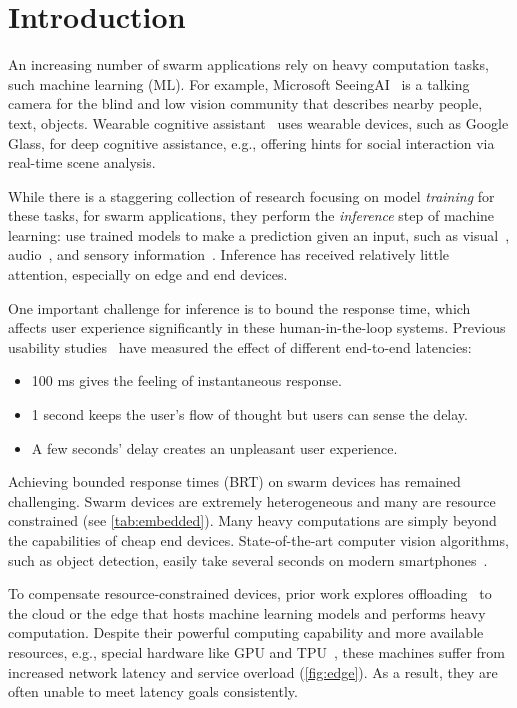\section{Introduction}
\label{sec:introduction}

An increasing number of swarm applications rely on heavy computation tasks, such
machine learning (ML). For example, Microsoft SeeingAI~\cite{seeingai} is a
talking camera for the blind and low vision community that describes nearby
people, text, objects. Wearable cognitive assistant~\cite{ha2014towards} uses
wearable devices, such as Google Glass, for deep cognitive assistance, e.g.,
offering hints for social interaction via real-time scene analysis.

While there is a staggering collection of research focusing on model
\textit{training} for these tasks, for swarm applications, they perform the
\textit{inference} step of machine learning: use trained models to make a
prediction given an input, such as visual~\cite{googlelens, ha2014towards,
  seeingai}, audio~\cite{alexa, applesiri, cortana}, and sensory
information~\cite{laput2017synthetic, lu2010jigsaw}. Inference has received
relatively little attention, especially on edge and end devices.

One important challenge for inference is to bound the response time, which
affects user experience significantly in these human-in-the-loop
systems. Previous usability studies~\cite{nielsen1994usability,
  schneiderman1998designing} have measured the effect of different end-to-end
latencies:

\begin{itemize}[noitemsep, topsep=0pt]
\item 100 ms gives the feeling of instantaneous response.
\item 1 second keeps the user's flow of thought but users can sense the delay.
\item A few seconds' delay creates an unpleasant user experience.
\end{itemize}

Achieving bounded response times (BRT) on swarm devices has remained
challenging. Swarm devices are extremely heterogeneous and many are resource
constrained (see \autoref{tab:embedded}). Many heavy computations are simply
beyond the capabilities of cheap end devices. State-of-the-art computer vision
algorithms, such as object detection, easily take several seconds on modern
smartphones~\cite{chen2015glimpse}.

To compensate resource-constrained devices, prior work explores
offloading~\cite{chun2011clonecloud,cuervo2010maui} to the cloud or the edge
that hosts machine learning models and performs heavy computation. Despite their
powerful computing capability and more available resources, e.g., special
hardware like GPU and TPU~\cite{jouppi2017datacenter}, these machines suffer
from increased network latency and service overload (\autoref{fig:edge}). As a
result, they are often unable to meet latency goals consistently.

